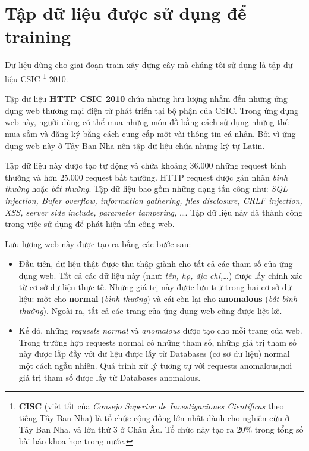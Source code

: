 \documentclass[../main-report.tex]{subfiles}
\begin{document}
\section{Tập dữ liệu được sử dụng để training}
Dữ liệu dùng cho giai đoạn train xây dựng cây mà chúng tôi sử dụng là tập dữ liệu CSIC \footnote{\textbf{CISC} (viết tắt của \emph{Consejo Superior de Investigaciones Científicas} theo tiếng Tây Ban Nha) là tổ chức cộng đồng lớn nhất dành cho nghiên cứu ở Tây Ban Nha, và lớn thứ 3 ở Châu Âu. Tổ chức này tạo ra 20\% trong tổng số bài báo khoa học trong nước.} 2010.

Tập dữ liệu \textbf{HTTP CSIC 2010} chứa những lưu lượng nhắm đến những ứng dụng web thương mại điện tử phát triển tại bộ phận của CSIC. Trong ứng dụng web này, người dùng có thể mua những món đồ bằng cách sử dụng những thẻ mua sắm và đăng ký bằng cách cung cấp một vài thông tin cá nhân. Bởi vì ứng dụng web này ở Tây Ban Nha nên tập dữ liệu chứa những ký tự Latin.

Tập dữ liệu này được tạo tự động và chứa khoảng 36.000 những request bình thường và hơn 25.000 request bất thường. HTTP request được gán nhãn \emph{bình thường} hoặc \emph{bất thường}. Tập dữ liệu bao gồm những dạng tấn công như: \emph{SQL injection, Bufer overflow, information gathering, files disclosure, CRLF injection, XSS, server side include, parameter tampering,} \ldots. Tập dữ liệu này đã thành công trong việc sử dụng để phát hiện tấn công web.

Lưu lượng web này được tạo ra bằng các bước sau:

\begin{itemize}
\item Đầu tiên, dữ liệu thật được thu thập giành cho tất cả các tham số của ứng dụng web. Tất cả các dữ liệu này (như: \emph{tên, họ, địa chỉ,}\ldots) được lấy chính xác từ cơ sở dữ liệu thực tế. Những giá trị này được lưu trữ trong hai cơ sở dữ liệu: một cho \textbf{normal} (\emph{bình thường}) và cái còn lại cho \textbf{anomalous} (\emph{bất bình thường}). Ngoài ra, tất cả các trang của ứng dụng web cũng được liệt kê.

\item Kế đó, những \emph{requests normal} và \emph{anomalous} được tạo cho mỗi trang của web. Trong trường hợp requests normal có những tham số, những giá trị tham số này được lắp đầy với dữ liệu được lấy từ Databases (cơ sơ dữ liệu) normal một cách ngẫu nhiên. Quá trình xử lý tương tự với requests anomalous,nơi giá trị tham số được lấy từ Databases anomalous.
\end{itemize}
\end{document}
